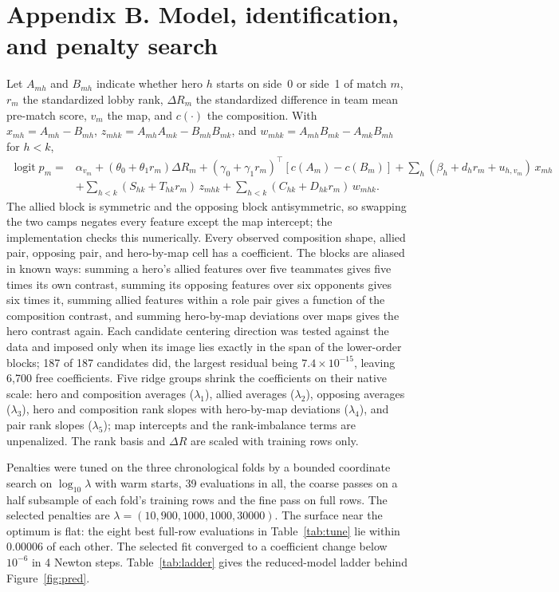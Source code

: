 \documentclass[11pt]{article}
\begin{document}
\section*{Appendix B. Model, identification, and penalty search}

Let $A_{mh}$ and $B_{mh}$ indicate whether hero $h$ starts on side~0 or side~1 of match $m$, $r_m$ the
standardized lobby rank, $\Delta R_m$ the standardized difference in team mean pre-match score, $v_m$ the
map, and $c(\cdot)$ the composition. With $x_{mh}=A_{mh}-B_{mh}$, $z_{mhk}=A_{mh}A_{mk}-B_{mh}B_{mk}$, and
$w_{mhk}=A_{mh}B_{mk}-A_{mk}B_{mh}$ for $h<k$,
\begin{align*}
\operatorname{logit}p_m ={}& \alpha_{v_m}+(\theta_0+\theta_1 r_m)\Delta R_m
 +(\gamma_0+\gamma_1 r_m)^\top[c(A_m)-c(B_m)]
 +\sum_h(\beta_h+d_h r_m+u_{h,v_m})\,x_{mh}\\
&+\sum_{h<k}(S_{hk}+T_{hk}r_m)\,z_{mhk}+\sum_{h<k}(C_{hk}+D_{hk}r_m)\,w_{mhk}.
\end{align*}
The allied block is symmetric and the opposing block antisymmetric, so swapping the two camps negates
every feature except the map intercept; the implementation checks this numerically. Every observed
composition shape, allied pair, opposing pair, and hero-by-map cell has a coefficient. The blocks are
aliased in known ways: summing a hero's allied features over five teammates gives five times its own
contrast, summing its opposing features over six opponents gives six times it, summing allied features
within a role pair gives a function of the composition contrast, and summing hero-by-map deviations over
maps gives the hero contrast again. Each candidate centering direction was tested against the data and
imposed only when its image lies exactly in the span of the lower-order blocks; 187 of
187 candidates did, the largest residual being $7.4\times10^{-15}$, leaving 6,700 free
coefficients. Five ridge groups shrink the coefficients on their native scale: hero and composition
averages ($\lambda_1$), allied averages ($\lambda_2$), opposing averages ($\lambda_3$), hero and
composition rank slopes with hero-by-map deviations ($\lambda_4$), and pair rank slopes ($\lambda_5$);
map intercepts and the rank-imbalance terms are unpenalized. The rank basis and $\Delta R$ are scaled
with training rows only.

Penalties were tuned on the three chronological folds by a bounded coordinate search on $\log_{10}\lambda$
with warm starts, 39 evaluations in all, the coarse passes on a half subsample of each fold's
training rows and the fine pass on full rows. The selected penalties are $\lambda=(10, 900, 1000, 1000, 30000)$. The
surface near the optimum is flat: the eight best full-row evaluations in Table~\ref{tab:tune} lie within
0.00006 of each other. The selected fit converged to a coefficient change below $10^{-6}$ in
4 Newton steps. Table~\ref{tab:ladder} gives the reduced-model ladder behind
Figure~\ref{fig:pred}.
\end{document}
